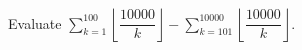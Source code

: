 Evaluate $\displaystyle\sum_{k=1}^{100}\left\lfloor\dfrac{10000}{k}\right\rfloor-\sum_{k=101}^{10000}\left\lfloor\dfrac{10000}{k}\right\rfloor$.
